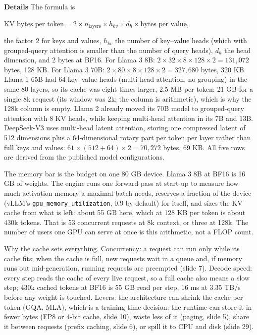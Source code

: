 \documentclass[11pt,letterpaper]{article}
\newcommand{\para}[1]{\medskip\noindent\textbf{#1}\quad}
\newenvironment{formulas}{\begin{tcolorbox}[formulabox]}{\end{tcolorbox}}
\newcommand{\KV}{\mathrm{KV}}
\begin{document}
\para{Details} The formula is
\begin{formulas}
$\KV\text{ bytes per token}=2\times n_{\text{layers}}\times h_{kv}\times d_h\times\text{bytes per value}$,
\end{formulas}
the factor 2 for keys and values, $h_{kv}$ the number of key--value heads (which with grouped-query attention is smaller than the number of query heads), $d_h$ the head dimension, and 2 bytes at BF16. For Llama 3 8B: $2\times32\times8\times128\times2=131{,}072$ bytes, 128 KB. For Llama 3 70B: $2\times80\times8\times128\times2=327{,}680$ bytes, 320 KB. Llama 1 65B had 64 key--value heads (multi-head attention, no grouping) in the same 80 layers, so its cache was eight times larger, 2.5 MB per token: 21 GB for a single 8k request (its window was 2k; the column is arithmetic), which is why the 128k column is empty. Llama 2 already moved its 70B model to grouped-query attention with 8 KV heads, while keeping multi-head attention in its 7B and 13B. DeepSeek-V3 uses multi-head latent attention, storing one compressed latent of 512 dimensions plus a 64-dimensional rotary part per token per layer rather than full keys and values: $61\times(512+64)\times2=70{,}272$ bytes, 69 KB. All five rows are derived from the published model configurations.

The memory bar is the budget on one 80 GB device. Llama 3 8B at BF16 is 16 GB of weights. The engine runs one forward pass at start-up to measure how much activation memory a maximal batch needs, reserves a fraction of the device (vLLM's \texttt{gpu\_memory\_utilization}, 0.9 by default) for itself, and sizes the KV cache from what is left: about 55 GB here, which at 128 KB per token is about 430k tokens. That is 53 concurrent requests at 8k context, or three at 128k. The number of users one GPU can serve at once is this arithmetic, not a FLOP count.

Why the cache sets everything. Concurrency: a request can run only while its cache fits; when the cache is full, new requests wait in a queue and, if memory runs out mid-generation, running requests are preempted (slide 7). Decode speed: every step reads the cache of every live request, so a full cache also means a slow step; 430k cached tokens at BF16 is 55 GB read per step, 16 ms at 3.35 TB/s before any weight is touched. Levers: the architecture can shrink the cache per token (GQA, MLA), which is a training-time decision; the runtime can store it in fewer bytes (FP8 or 4-bit cache, slide 10), waste less of it (paging, slide 5), share it between requests (prefix caching, slide 6), or spill it to CPU and disk (slide 29).
\end{document}
